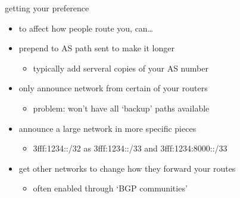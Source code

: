 \begin{frame}{getting your preference}
    \begin{itemize}
    \item to affect how people route you, can\ldots
    \vspace{.5cm}
    \item prepend to AS path sent to make it longer
        \begin{itemize}
        \item typically add serveral copies of your AS number
        \end{itemize}
    \item only announce network from certain of your routers
        \begin{itemize}
        \item problem: won't have all `backup' paths available
        \end{itemize}
    \item announce a large network in more specific pieces
        \begin{itemize}
        \item 3fff:1234::/32 as 3fff:1234::/33 and 3fff:1234:8000::/33
        \end{itemize}
    \item get other networks to change how they forward your routes
        \begin{itemize}
        \item often enabled through `BGP communities'
        \end{itemize}
    \end{itemize}
\end{frame}
